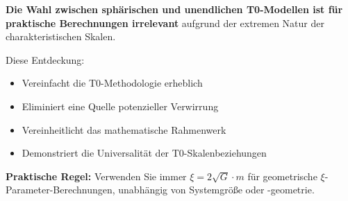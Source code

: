 \documentclass[12pt,a4paper]{article}
\begin{document}
\begin{tcolorbox}[colback=green!5!white,colframe=green!75!black,title=Schlüsselergebnis]
	\textbf{Die Wahl zwischen sphärischen und unendlichen T0-Modellen ist für praktische Berechnungen irrelevant} aufgrund der extremen Natur der charakteristischen Skalen.
	
	Diese Entdeckung:
	\begin{itemize}
		\item Vereinfacht die T0-Methodologie erheblich
		\item Eliminiert eine Quelle potenzieller Verwirrung
		\item Vereinheitlicht das mathematische Rahmenwerk
		\item Demonstriert die Universalität der T0-Skalenbeziehungen
	\end{itemize}
	
	\textbf{Praktische Regel:} Verwenden Sie immer $\xi = 2\sqrt{G} \cdot m$ für geometrische $\xi$-Parameter-Berechnungen, unabhängig von Systemgröße oder -geometrie.
\end{tcolorbox}
	
\end{document}

